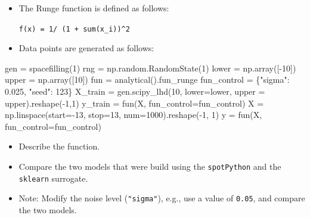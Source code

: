 \documentclass[
  letterpaper,
  DIV=11,
  numbers=noendperiod]{scrreprt}
\newenvironment{Shaded}{\begin{snugshade}}{\end{snugshade}}
\newcommand{\DecValTok}[1]{\textcolor[rgb]{0.68,0.00,0.00}{#1}}
\newcommand{\FloatTok}[1]{\textcolor[rgb]{0.68,0.00,0.00}{#1}}
\newcommand{\NormalTok}[1]{\textcolor[rgb]{0.00,0.23,0.31}{#1}}
\newcommand{\OperatorTok}[1]{\textcolor[rgb]{0.37,0.37,0.37}{#1}}
\newcommand{\StringTok}[1]{\textcolor[rgb]{0.13,0.47,0.30}{#1}}
\providecommand{\tightlist}{%
  \setlength{\itemsep}{0pt}\setlength{\parskip}{0pt}}\usepackage{longtable,booktabs,array}
\begin{document}
\begin{itemize}
\item
  The Runge function is defined as follows:

  \texttt{f(x)\ =\ 1/\ (1\ +\ sum(x\_i))\^{}2}
\item
  Data points are generated as follows:
\end{itemize}

\begin{Shaded}
\begin{Highlighting}[]
\NormalTok{gen }\OperatorTok{=}\NormalTok{ spacefilling(}\DecValTok{1}\NormalTok{)}
\NormalTok{rng }\OperatorTok{=}\NormalTok{ np.random.RandomState(}\DecValTok{1}\NormalTok{)}
\NormalTok{lower }\OperatorTok{=}\NormalTok{ np.array([}\OperatorTok{{-}}\DecValTok{10}\NormalTok{])}
\NormalTok{upper }\OperatorTok{=}\NormalTok{ np.array([}\DecValTok{10}\NormalTok{])}
\NormalTok{fun }\OperatorTok{=}\NormalTok{ analytical().fun\_runge}
\NormalTok{fun\_control }\OperatorTok{=}\NormalTok{ \{}\StringTok{"sigma"}\NormalTok{: }\FloatTok{0.025}\NormalTok{,}
               \StringTok{"seed"}\NormalTok{: }\DecValTok{123}\NormalTok{\}}
\NormalTok{X\_train }\OperatorTok{=}\NormalTok{ gen.scipy\_lhd(}\DecValTok{10}\NormalTok{, lower}\OperatorTok{=}\NormalTok{lower, upper }\OperatorTok{=}\NormalTok{ upper).reshape(}\OperatorTok{{-}}\DecValTok{1}\NormalTok{,}\DecValTok{1}\NormalTok{)}
\NormalTok{y\_train }\OperatorTok{=}\NormalTok{ fun(X, fun\_control}\OperatorTok{=}\NormalTok{fun\_control)}
\NormalTok{X }\OperatorTok{=}\NormalTok{ np.linspace(start}\OperatorTok{={-}}\DecValTok{13}\NormalTok{, stop}\OperatorTok{=}\DecValTok{13}\NormalTok{, num}\OperatorTok{=}\DecValTok{1000}\NormalTok{).reshape(}\OperatorTok{{-}}\DecValTok{1}\NormalTok{, }\DecValTok{1}\NormalTok{)}
\NormalTok{y }\OperatorTok{=}\NormalTok{ fun(X, fun\_control}\OperatorTok{=}\NormalTok{fun\_control)}
\end{Highlighting}
\end{Shaded}

\begin{itemize}
\tightlist
\item
  Describe the function.
\item
  Compare the two models that were build using the \texttt{spotPython}
  and the \texttt{sklearn} surrogate.
\item
  Note: Modify the noise level (\texttt{"sigma"}), e.g., use a value of
  \texttt{0.05}, and compare the two models.
\end{itemize}
\end{document}
